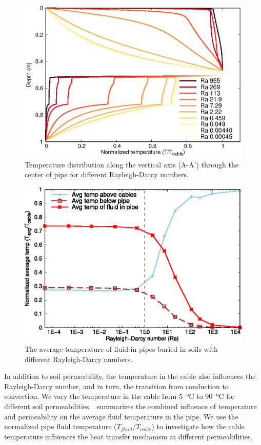 \documentclass[Journal,letterpaper,InsideFigs]{ascelike-new}
\begin{document}
\begin{figure}
    \centering
    \includegraphics{figs/temp-pipe.eps}
    \caption{Temperature distribution along the vertical axis (A-A’) through the center of pipe for different Rayleigh-Darcy numbers.}
    \label{fig:ra-vline}
\end{figure}

\begin{figure}
    \centering
    \includegraphics{figs/heat-pipe.eps}
    \caption{The average temperature of fluid in pipes buried in soils with different Rayleigh-Darcy numbers.}
    \label{fig:heat-pipe}
\end{figure}

In addition to soil permeability, the temperature in the cable also influences the Rayleigh-Darcy number, and in turn, the transition from conduction to convection. We vary the temperature in the cable from \SI{5}{\celsius} to \SI{90}{\celsius} for different soil permeabilities.~ summarizes the combined influence of temperature and permeability on the average fluid temperature in the pipe. We use the normalized pipe fluid temperature ($T_{fluid}/T_{cable}$) to investigate how the cable temperature influences the heat transfer mechanism at different permeabilities. 
\end{document}
